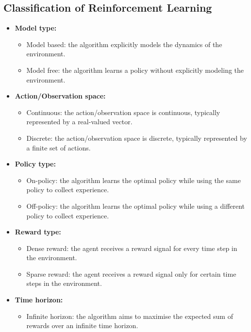 \subsection{Classification of Reinforcement Learning}
\begin{minipage}{\textwidth}
\begin{itemize}

    \item \textbf{Model type:}
    \begin{itemize}
    \item Model based: the algorithm explicitly models the dynamics of the environment.
    \item Model free: the algorithm learns a policy without explicitly modeling the environment.
    \end{itemize}
    \item \textbf{Action/Observation space:}
    \begin{itemize}
    \item Continuous: the action/observation space is continuous, typically represented by a real-valued vector.
    \item Discrete: the action/observation space is discrete, typically represented by a finite set of actions.
    \end{itemize}
    \item \textbf{Policy type:}
    \begin{itemize}
    \item On-policy: the algorithm learns the optimal policy while using the same policy to collect experience.
    \item Off-policy: the algorithm learns the optimal policy while using a different policy to collect experience.
    \end{itemize}
    \item \textbf{Reward type:}
    \begin{itemize}
    \item Dense reward: the agent receives a reward signal for every time step in the environment.
    \item Sparse reward: the agent receives a reward signal only for certain time steps in the environment.
    \end{itemize}
    \item \textbf{Time horizon:}
    \begin{itemize}
    \item Infinite horizon: the algorithm aims to maximise the expected sum of rewards over an infinite time horizon.

\end{itemize}
\end{itemize}
\end{minipage}
